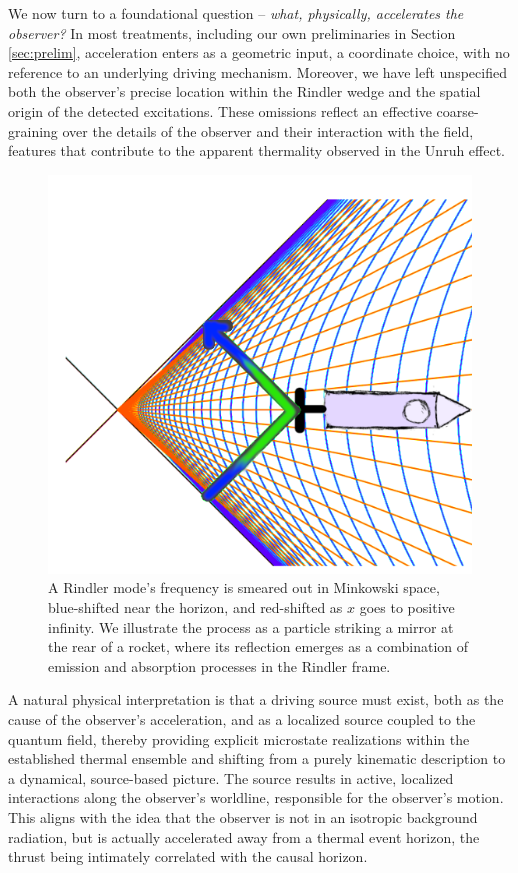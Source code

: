 \documentclass[12pt,a4paper]{article}
\begin{document}
We now turn to a foundational question -- {\it what, physically, accelerates the observer?} In most treatments, including our own preliminaries in Section \ref{sec:prelim}, acceleration enters as a geometric input, a coordinate choice, with no reference to an underlying driving mechanism. Moreover, we have left unspecified both the observer’s precise location within the Rindler wedge and the spatial origin of the detected excitations. These omissions reflect an effective coarse-graining over the details of the observer and their interaction with the field, features that contribute to the apparent thermality observed in the Unruh effect.

\begin{figure}[h]
\centering
\includegraphics[scale=1.0]{emit_absorb.png}
\captionsetup{width=0.7\textwidth}
\caption{A Rindler mode's frequency is smeared out in Minkowski space, blue-shifted near the horizon, and red-shifted as $x$ goes to positive infinity. We illustrate the process as a particle striking a mirror at the rear of a rocket, where its reflection emerges as a combination of emission and absorption processes in the Rindler frame.}
\label{emit_absorb}
\end{figure}


A natural physical interpretation is that a driving source must exist, both as the cause of the observer’s acceleration, and as a localized source coupled to the quantum field, thereby providing explicit microstate realizations within the established thermal ensemble and shifting from a purely kinematic description to a dynamical, source-based picture. The source results in active, localized interactions along the observer’s worldline, responsible for the observer’s motion.  This aligns with the idea that the observer is not in an isotropic background radiation, but is actually accelerated away from a thermal event horizon, the thrust being intimately correlated with the causal horizon.
\end{document}
